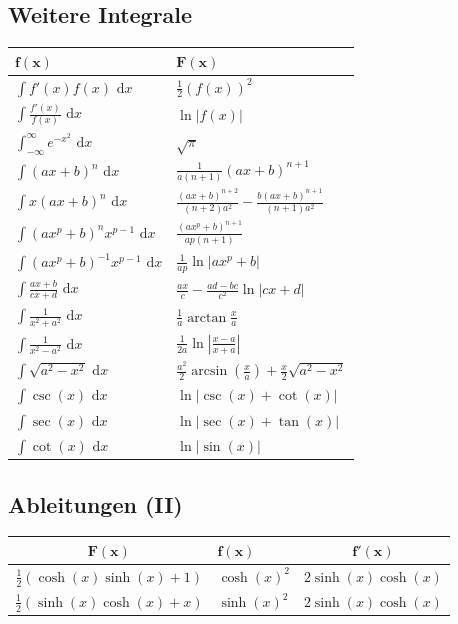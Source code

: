 \documentclass[a4paper,10pt]{article}
\def\dx{\text{ d}x}
\begin{document}
\subsection{Weitere Integrale}
\begin{center}
 \begin{tabularx}{\linewidth}{>{\centering\arraybackslash}X>{\centering\arraybackslash}X}
  \toprule
  $\mathbf{f(x)}$ & $\mathbf{F(x)}$ \\
  \midrule
  $\int f'(x) f(x) \dx$ & $\frac{1}{2}(f(x))^2$ \\
  $\int \frac{f'(x)}{f(x)} \dx$ & $\ln|f(x)|$ \\
  $\int_{-\infty}^\infty e^{-x^2} \dx$ & $\sqrt{\pi}$ \\
  $\int (ax+b)^n \dx$ & $\frac{1}{a(n+1)}(ax+b)^{n+1}$ \\
  $\int x(ax+b)^n \dx$ & $\frac{(ax+b)^{n+2}}{(n+2)a^2} - \frac{b(ax+b)^{n+1}}{(n+1)a^2}$ \\
  $\int (ax^p+b)^n x^{p-1} \dx$ & $\frac{(ax^p+b)^{n+1}}{ap(n+1)}$ \\
  $\int (ax^p + b)^{-1} x^{p-1} \dx$ & $\frac{1}{ap} \ln |ax^p + b|$ \\
  $\int \frac{ax+b}{cx+d} \dx$ & $\frac{ax}{c} - \frac{ad-bc}{c^2} \ln |cx +d|$ \\
  $\int \frac{1}{x^2+a^2} \dx$ & $\frac{1}{a} \arctan \frac{x}{a}$ \\
  $\int \frac{1}{x^2 - a^2} \dx$ & $\frac{1}{2a} \ln\left| \frac{x-a}{x+a} \right|$ \\
  $\int \sqrt{a^2 - x^2} \dx $ & $\frac{a^2}{2} \arcsin(\frac{x}{a}) + \frac{x}{2} \sqrt{a^2 - x^2}$ \\
  $\int \csc(x) \dx $ & $\ln|\csc(x) + \cot(x)|$ \\
  $\int \sec(x) \dx $ & $\ln|\sec(x) + \tan(x)|$ \\
  $\int \cot(x) \dx $ & $\ln|\sin(x)|$ \\
  \bottomrule
 \end{tabularx} 
\end{center}

\subsection{Ableitungen (II)}
\begin{center}
  \begin{tabularx}{\linewidth}{c>{\centering\arraybackslash}Xc}
  \toprule
  $\mathbf{F(x)}$ & $\mathbf{f(x)}$ & $\mathbf{f'(x)}$ \\
  \midrule
  $\frac{1}{2}(\cosh(x)\sinh(x)+1)$ & $\cosh(x)^2$ & $2\sinh(x)\cosh(x)$\\
  $\frac{1}{2}(\sinh(x)\cosh(x) + x)$ & $\sinh(x)^2$ & $2\sinh(x)\cosh(x)$\\
  \bottomrule
  \end{tabularx}
\end{center}
\end{document}
